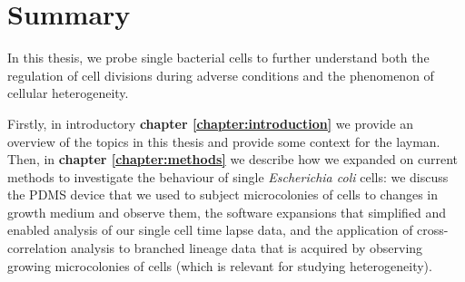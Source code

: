 

\chapter*{Summary}


In this thesis, we probe single bacterial cells to 
further understand both
the regulation of cell divisions during adverse conditions
and the phenomenon of cellular heterogeneity.

Firstly, in introductory \textbf{chapter \ref{chapter:introduction}} we 
provide an overview of the topics in this thesis and provide some context for the layman.
%
Then, in \textbf{chapter \ref{chapter:methods}} we describe how we expanded on current methods to investigate the behaviour of single \textit{Escherichia coli} cells: 
%
we discuss the PDMS device that we used to subject microcolonies of cells to changes in growth medium and observe them,
the software expansions that simplified and enabled analysis of our single cell time lapse data, and 
the application of cross-correlation analysis to branched lineage data that is acquired by observing growing microcolonies of cells (which is relevant for studying heterogeneity).

